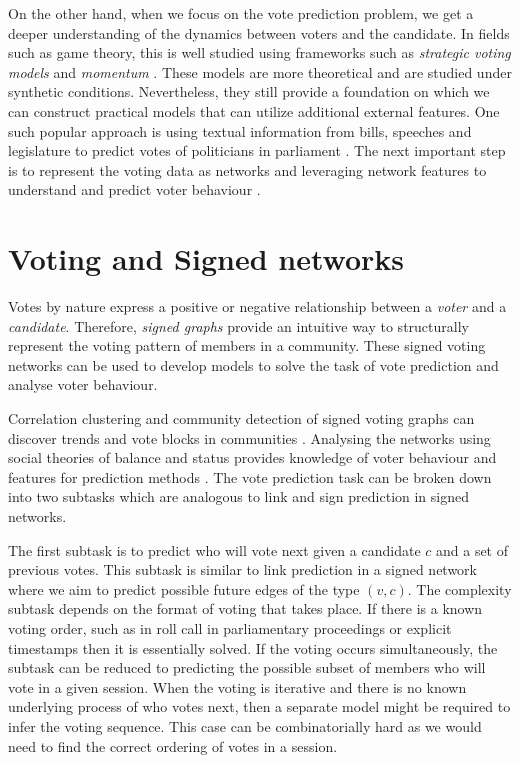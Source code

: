On the other hand, when we focus on the vote prediction problem, we get a deeper understanding of the dynamics between voters and the candidate. In fields such as game theory, this is well studied using frameworks such as \textit{strategic voting models} and \textit{momentum} \cite{meir2020strategic,zou2015strategicDoodle,ali2006a,banerjee1992simple}. These models are more theoretical and are studied under synthetic conditions. Nevertheless, they still provide a foundation on which we can construct practical models that can utilize additional external features. One such popular approach is using textual information from bills, speeches and legislature to predict votes of politicians in parliament \cite{budhwar2018predicting,gerrish2011predicting}. The next important step is to represent the voting data as networks and leveraging network features to understand and predict voter behaviour \cite{tal2015a,brito2020aBrazil,kearns2009behavioral,derr2018congressional,arinik2017signed}.

\section{Voting and Signed networks}
Votes by nature express a positive or negative relationship between a \textit{voter} and a \textit{candidate}. Therefore, \textit{signed graphs} provide an intuitive way to structurally represent the voting pattern of members in a community. These signed voting networks can be used to develop models to solve the task of vote prediction and analyse voter behaviour.

Correlation clustering and community detection of signed voting graphs can discover trends and vote blocks in communities \cite{brito2020aBrazil,arinik2017signed}. Analysing the networks using social theories of balance and status provides knowledge of voter behaviour and features for prediction methods \cite{levorato2016brazilian,derr2018congressional}. The vote prediction task can be broken down into two subtasks which are analogous to link and sign prediction in signed networks. 

The first subtask is to predict who will vote next given a candidate $c$ and a set of previous votes. This subtask is similar to link prediction in a signed network where we aim to predict possible future edges of the type $(v,c)$. The complexity subtask depends on the format of voting that takes place. If there is a known voting order, such as in roll call in parliamentary proceedings or explicit timestamps then it is essentially solved. If the voting occurs simultaneously, the subtask can be reduced to predicting the possible subset of members who will vote in a given session. When the voting is iterative and there is no known underlying process of who votes next, then a separate model might be required to infer the voting sequence. This case can be combinatorially hard as we would need to find the correct ordering of votes in a session.

